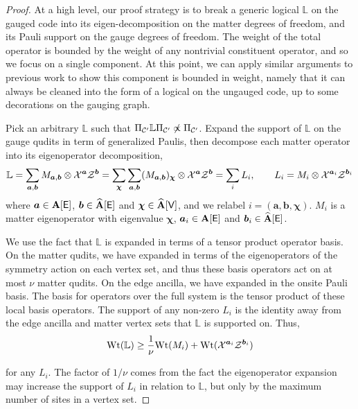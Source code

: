 \documentclass[11pt]{article}
\begin{document}
\begin{proof}

At a high level, our proof strategy is to break a generic logical $\mathbb{L}$ on the gauged code into its eigen-decomposition on the matter degrees of freedom, and its Pauli support on the gauge degrees of freedom. The weight of the total operator is bounded by the weight of any nontrivial constituent operator, and so we focus on a single component. At this point, we can apply similar arguments to previous work \cite{williamson2024lowoverheadfaulttolerantquantumcomputation, williamson2026fast} to show this component is bounded in weight, namely that it can always be cleaned into the form of a logical on the ungauged code, up to some decorations on the gauging graph. 

Pick an arbitrary $\mathbb{L}$ such that $\Pi_{\mathcal{C}'}\mathbb{L}\Pi_{\mathcal{C}'} \not\propto \Pi_{\mathcal{C}'}$. 
Expand the support of $\mathbb{L}$ on the gauge qudits in term of generalized Paulis, then decompose each matter operator into its eigenoperator decomposition,
    \[
    \mathbb{L} = \sum_{\bm a,\bm b} M_{\bm a,\bm b}\otimes \mathcal{X}^{\bm a}\mathcal{Z}^{\bm b} = \sum_{\bm{\chi}}\sum_{\bm a ,\bm b} (M_{\bm a, \bm b})_{\bm{\chi}} \otimes \mathcal{X}^{\bm a} \mathcal{Z}^{\bm b}= \sum_{i}L_i,\qquad L_i = M_i \otimes \mathcal{X}^{\bm a_i}\mathcal{Z}^{\bm b_i}
    \]
where $\bm a\in \mathbf{A}[\mathsf{E}]$, $\bm b\in \widehat{\mathbf{A}}[\mathsf{E}]$ and $\bm{\chi} \in \widehat{\mathbf{A}}[\mathsf{V}]$, and we relabel $i=(\bm a, \bm b, \bm{\chi})$.
    $M_i$ is a matter eigenoperator with eigenvalue $\bm{\chi}$,    $ \bm a_i\in \mathbf{A}[\mathsf{E}]$ and $ \bm b_i\in \widehat{\mathbf{A}}[\mathsf{E}]$.

    We use the fact that $\mathbb{L}$ is expanded in terms of a tensor product operator basis. On the matter qudits, we have expanded in terms of the eigenoperators of the symmetry action on each vertex set, and thus these basis operators act on at most $\nu$ matter qudits.
    On the edge ancilla, we have expanded in the onsite Pauli basis. 
    The basis for operators over the full system is the tensor product of these local basis operators.
    The support of any non-zero $L_i$ is the identity away from the edge ancilla and matter vertex sets that $\mathbb{L}$ is supported on. Thus, \begin{align}
        \mathrm{Wt}(\mathbb{L})\ge \frac{1}{\nu} \mathrm{Wt}(M_i) + \mathrm{Wt}(\mathcal{X}^{\bm{a}_i} \mathcal{Z}^{\bm{b}_i}) \label{eq:eigendecomp-enlarged-support}
    \end{align}

    for any $L_i$. 
    The factor of $1/\nu$ comes from the fact the eigenoperator expansion may increase the support of $L_i$ in relation to $\mathbb{L}$, but only by the maximum number of sites in a vertex set.


\end{proof}
\end{document}
